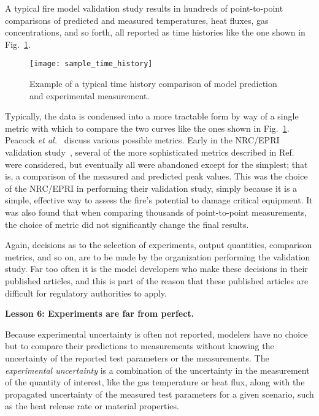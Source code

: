 \documentclass[fleqn,b5paper]{article}
\begin{document}
A typical fire model validation study results in hundreds of point-to-point comparisons of predicted and measured temperatures, heat fluxes, gas concentrations, and so forth, all reported as time histories like the one shown in Fig.~\ref{temp_history}.
\begin{figure}[ht]
\begin{center}
\texttt{[image: sample\_time\_history]}
\end{center}
\caption[Sample time history plots.]{Example of a typical time history comparison of model prediction and experimental measurement.}
\label{temp_history}
\end{figure}
Typically, the data is condensed into a more tractable form by way of a single metric with which to compare the two curves like the ones shown in Fig.~\ref{temp_history}. Peacock {\em et al.}~\cite{Peacock:FSJ1999} discuss various possible metrics. Early in the NRC/EPRI validation study~\cite{NUREG_1824}, several of the more sophisticated metrics described in Ref.~\cite{Peacock:FSJ1999} were considered, but eventually all were abandoned except for the simplest; that is, a comparison of the measured and predicted peak values. This was the choice of the NRC/EPRI in performing their validation study, simply because it is a simple, effective way to assess the fire's potential to damage critical equipment. It was also found that when comparing thousands of point-to-point measurements, the choice of metric did not significantly change the final results.

Again, decisions as to the selection of experiments, output quantities, comparison metrics, and so on, are to be made by the organization performing the validation study. Far too often it is the model developers who make these decisions in their published articles, and this is part of the reason that these published articles are difficult for regulatory authorities to apply. 


\vspace{\parskip}
{\bf Lesson 6: Experiments are far from perfect.}

Because experimental uncertainty is often not reported, modelers have no choice but to compare their predictions to measurements without knowing the uncertainty of the reported test parameters or the measurements. The {\em experimental uncertainty} is a combination of the uncertainty in the measurement of the quantity of interest, like the gas temperature or heat flux, along with the propagated uncertainty of the measured test parameters for a given scenario, such as the heat release rate or material properties.
\end{document}
